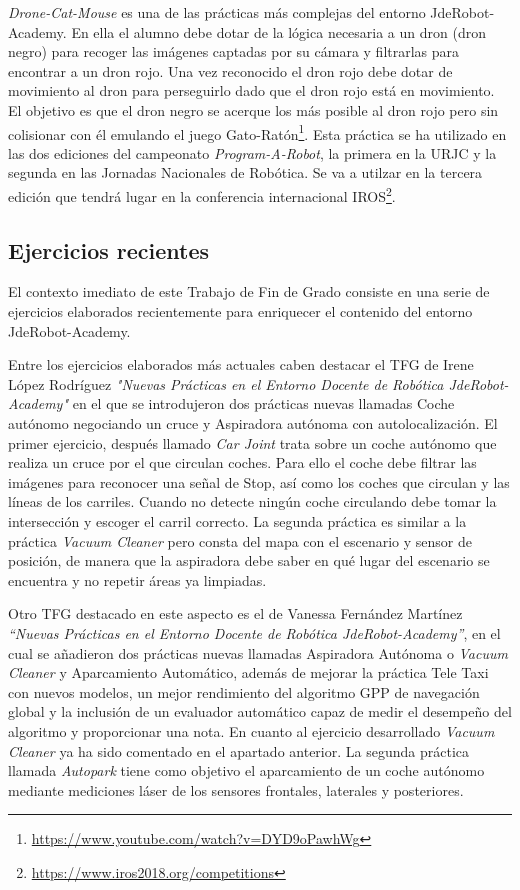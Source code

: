 \textit{Drone-Cat-Mouse} es una de las prácticas más complejas del entorno JdeRobot-Academy. En ella el alumno debe dotar de la lógica necesaria a un dron (dron negro) para recoger las imágenes captadas por su cámara y filtrarlas para encontrar a un dron rojo. Una vez reconocido el dron rojo debe dotar de movimiento al dron para perseguirlo dado que el dron rojo está en movimiento. El objetivo es que el dron negro se acerque los más posible al dron rojo pero sin colisionar con él emulando el juego Gato-Ratón\footnote{\url{https://www.youtube.com/watch?v=DYD9oPawhWg}}. Esta práctica se ha utilizado en las dos ediciones del campeonato \textit{Program-A-Robot}, la primera en la URJC y la segunda en las Jornadas Nacionales de Robótica. Se va a utilzar en la tercera edición que tendrá lugar en la conferencia internacional IROS\footnote{\url{https://www.iros2018.org/competitions}}.

\subsection{Ejercicios recientes}

El contexto imediato de este Trabajo de Fin de Grado consiste en una serie de ejercicios elaborados recientemente  para enriquecer el contenido del entorno JdeRobot-Academy.

Entre los ejercicios elaborados más actuales caben destacar el TFG de Irene López Rodríguez \textit{"Nuevas Prácticas en el Entorno Docente de Robótica JdeRobot-Academy"}\cite{tfg1} en el que se introdujeron dos prácticas nuevas llamadas Coche autónomo negociando un cruce y Aspiradora autónoma con autolocalización. El primer ejercicio, después llamado \textit{Car Joint} trata sobre un coche autónomo que realiza un cruce por el que circulan coches. Para ello el coche debe filtrar las imágenes para reconocer una señal de Stop, así como los coches que circulan y las líneas de los carriles. Cuando no detecte ningún coche circulando debe tomar la intersección y escoger el carril correcto. La segunda práctica es similar a la práctica \textit{Vacuum Cleaner} pero consta del mapa con el escenario y sensor de posición, de manera que la aspiradora debe saber en qué lugar del escenario se encuentra y no repetir áreas ya limpiadas.

Otro TFG destacado en este aspecto es el de Vanessa Fernández Martínez \textit{{“Nuevas Prácticas en el Entorno Docente de Robótica JdeRobot-Academy”}}\cite{tfg2}, en el cual se añadieron dos prácticas nuevas llamadas Aspiradora Autónoma o \textit{Vacuum Cleaner} y Aparcamiento Automático, además de mejorar la práctica Tele Taxi con nuevos modelos, un mejor rendimiento del algoritmo GPP de navegación global y la inclusión de un evaluador automático capaz de medir el desempeño del algoritmo y proporcionar una nota. En cuanto al ejercicio desarrollado \textit{Vacuum Cleaner} ya ha sido comentado en el apartado anterior. La segunda práctica llamada \textit{Autopark} tiene como objetivo el aparcamiento de un coche autónomo mediante mediciones láser de los sensores frontales, laterales y posteriores.

